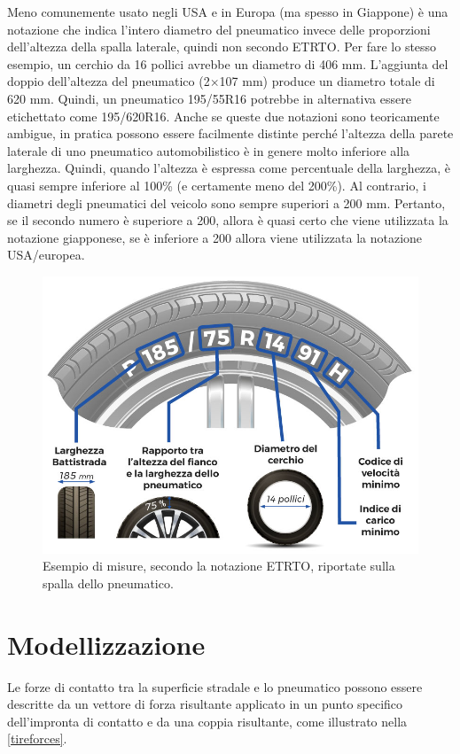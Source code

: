 Meno comunemente usato negli USA e in Europa (ma spesso in Giappone) è una notazione che indica l'intero diametro del pneumatico invece delle proporzioni dell'altezza della spalla laterale, quindi non secondo \ac{ETRTO}. Per fare lo stesso esempio, un cerchio da 16 pollici avrebbe un diametro di 406 mm. L'aggiunta del doppio dell'altezza del pneumatico (2$\times$107 mm) produce un diametro totale di 620 mm. Quindi, un pneumatico 195/55R16 potrebbe in alternativa essere etichettato come 195/620R16. Anche se queste due notazioni sono teoricamente ambigue, in pratica possono essere facilmente distinte perché l'altezza della parete laterale di uno pneumatico automobilistico è in genere molto inferiore alla larghezza. Quindi, quando l'altezza è espressa come percentuale della larghezza, è quasi sempre inferiore al 100\% (e certamente meno del 200\%). Al contrario, i diametri degli pneumatici del veicolo sono sempre superiori a 200 mm. Pertanto, se il secondo numero è superiore a 200, allora è quasi certo che viene utilizzata la notazione giapponese, se è inferiore a 200 allora viene utilizzata la notazione USA/europea.

\begin{figure}[h]
	\centering
	\includegraphics[width=0.7\linewidth]{Figures/tire_measures}
	\caption{Esempio di misure, secondo la notazione ETRTO, riportate sulla spalla dello pneumatico.}
	\label{tiremeasures}
\end{figure}
%
\section{Modellizzazione}
Le forze di contatto tra la superficie stradale e lo pneumatico possono essere descritte da un vettore di forza risultante applicato in un punto specifico dell'impronta di contatto e da una coppia risultante, come illustrato nella \figurename{  \ref{tireforces}}.

